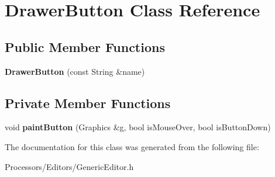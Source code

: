 \hypertarget{classDrawerButton}{\section{Drawer\-Button Class Reference}
\label{classDrawerButton}
}
\subsection*{Public Member Functions}
\begin{DoxyCompactItemize}
\item 
\hypertarget{classDrawerButton_a152c65b0b22c997a9424f5d45bbdabc3}{{\bfseries Drawer\-Button} (const String \&name)}\label{classDrawerButton_a152c65b0b22c997a9424f5d45bbdabc3}

\end{DoxyCompactItemize}
\subsection*{Private Member Functions}
\begin{DoxyCompactItemize}
\item 
\hypertarget{classDrawerButton_a94263ddea088b6c16793d79682df6c40}{void {\bfseries paint\-Button} (Graphics \&g, bool is\-Mouse\-Over, bool is\-Button\-Down)}\label{classDrawerButton_a94263ddea088b6c16793d79682df6c40}

\end{DoxyCompactItemize}


The documentation for this class was generated from the following file\-:\begin{DoxyCompactItemize}
\item 
Processors/\-Editors/Generic\-Editor.\-h\end{DoxyCompactItemize}

